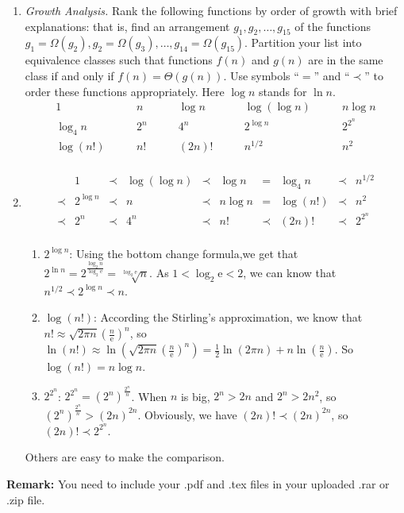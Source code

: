 \documentclass[12pt,a4paper]{article}
\makeatletter
\newtheorem*{solution}{Solution}
\theoremstyle{definition}
\renewenvironment{solution}[1][Solution] {\par\pushQED{\qed}\normalfont\topsep6\p@\@plus6\p@\relax\trivlist\item[\hskip\labelsep\bfseries#1\@addpunct{.}]\ignorespaces}{\popQED\endtrivlist\@endpefalse} \makeatother
\makeatother
\begin{document}
\begin{enumerate}
\item \textit{Growth Analysis.} Rank the following functions by order of growth with brief explanations: that is, find an arrangement $g_1, g_2, \ldots , g_{15}$ of the functions $g_1 = \Omega(g_2), g_2 = \Omega(g_3), \ldots, g_{14} = \Omega(g_{15})$.  Partition your list into equivalence classes such that functions $f(n)$ and $g(n)$ are in the same class if and only if $f(n) = \Theta(g(n))$. Use symbols ``$=$'' and ``$\prec$'' to order these functions appropriately. Here $\log n$ stands for $\ln n$.
$$
\begin{array}{ccccc}
	1 \quad & \quad n \quad & \quad \log n \quad & \quad \log (\log n) \quad & \quad n \log n \\
	\log_4 n \quad & \quad 2^n \quad & \quad 4^n \quad & \quad 2^{\log n} \quad & \quad 2^{2^n} \\
	\log (n!) \quad & \quad n! \quad & \quad (2n)! \quad & \quad  n^{1/2} \quad & \quad n^2 \\
\end{array}
$$
    \begin{solution}
$$    
    \begin{array}{cccccccccc}
	&1 &\prec & \log(\log n)&\prec & \log n&=& \log_4 n &\prec &n^{1/2}\\
	\prec& 2^{\log n}&\prec& n &\prec&n\log n &=&\log (n!) &\prec&n^2 \\
	\prec& 2^n&\prec& 4^n &\prec & n!&\prec &(2n)!& \prec&2^{2^n}\\
\end{array}
$$

\begin{enumerate}
\item $2^{\log n}$: Using the bottom change formula,we get that
$2^{\ln n} = 2^{\frac{\log_2 n}{\log_2 \mathrm{e}}} = \sqrt[\log_2 \mathrm{e}]{n}$.
As $1 < \log_2 \mathrm{e} < 2$, we can know that $n^{1/2}\prec 2^{\log n}\prec n $.

\item $\log (n!)$: According the Stirling's approximation, we know that $n! \approx \sqrt{2 \pi n}(\frac{n}{\mathrm{e}})^{n}$, so $\ln (n!) \approx \ln (\sqrt{2 \pi n}(\frac{n}{\mathrm{e}})^{n}) = \frac{1}{2}\ln(2 \pi n) + n\ln (\frac{n}{\mathrm{e}})$. So  $\log (n!) = n\log n$.

\item $2^{2^n}$: $2^{2^{n}} = (2^{n})^{\frac{2^{n}}{n}}$. When $n$ is big, $2^{n}>2n$ and $2^{n} > 2n^2$, so $(2^{n})^{\frac{2^{n}}{n}} > (2n)^{2n}$. Obviously, we have $(2n)!\prec(2n)^{2n}$, so $(2n)! \prec 2^{2^{n}}$.
\end{enumerate}

Others are easy to make the comparison.
    \end{solution}


\end{enumerate}

\vspace{20pt}

\textbf{Remark:} You need to include your .pdf and .tex files in your uploaded .rar or .zip file.

\end{document}
